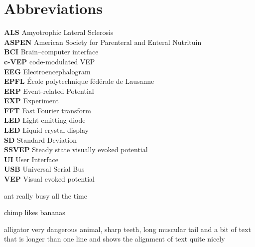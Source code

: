 \chapter{Abbreviations}
\textbf{ALS} Amyotrophic Lateral Sclerosis\\
\textbf{ASPEN}	American Society for Parenteral and Enteral Nutrituin\\
\textbf{BCI}	Brain–computer interface\\
\textbf{c-VEP}	code-modulated VEP\\
\textbf{EEG}	Electroencephalogram\\
\textbf{EPFL}	École polytechnique fédérale de Lausanne\\
\textbf{ERP}	Event-related Potential\\
\textbf{EXP}	Experiment\\
\textbf{FFT}	Fast Fourier transform\\
\textbf{LED}	Light-emitting diode\\
\textbf{LED}	Liquid crystal display\\
\textbf{SD}		Standard Deviation\\
\textbf{SSVEP}	Steady state visually evoked potential\\
\textbf{UI}		User Interface\\
\textbf{USB}		Universal Serial Bus\\
\textbf{VEP}		Visual evoked potential\\
\begin{labeling}
	\item [ant] really busy all the time
	\item [chimp] likes bananas
	\item [alligator] very dangerous animal, sharp teeth, long
	muscular tail and a bit of text that is longer than one
	line and shows the alignment of text quite nicely
\end{labeling}
